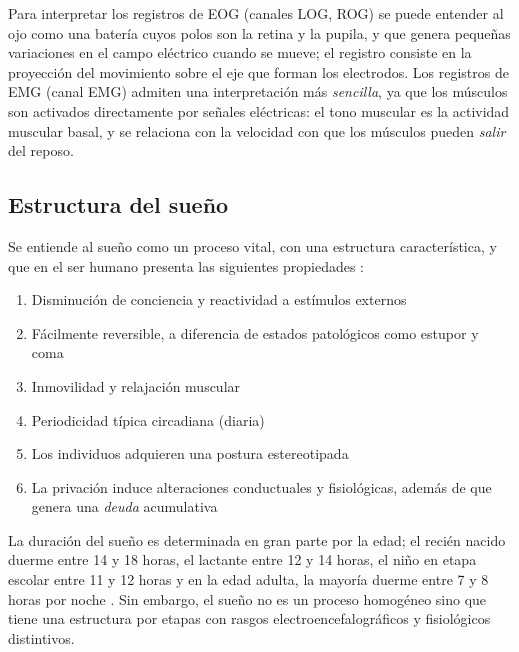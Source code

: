 Para interpretar los registros de EOG (canales LOG, ROG) se puede entender al ojo como una batería
cuyos  polos son la retina y la pupila, y que genera pequeñas variaciones en el campo eléctrico
cuando se mueve; el registro consiste en la proyección del movimiento sobre el eje que forman los
electrodos.
%
Los registros de EMG (canal EMG) admiten una interpretación más \textit{sencilla}, ya que los
músculos son activados directamente por señales eléctricas: el tono muscular es la actividad 
muscular basal, y se relaciona con la velocidad con que los músculos pueden \textit{salir} del 
reposo.



\subsection{Estructura del sueño}

Se entiende al sueño como un proceso vital, con una estructura característica, y que en el ser 
humano presenta las siguientes propiedades \cite{CarrilloMora}:
\begin{enumerate}
\item Disminución de conciencia y reactividad a estímulos externos
\item Fácilmente reversible, a diferencia de estados patológicos como estupor y coma
\item Inmovilidad y relajación muscular
\item Periodicidad típica circadiana (diaria)
\item Los individuos adquieren una postura estereotipada
\item La privación induce alteraciones conductuales y 
fisiológicas, además de que genera una \textit{deuda} acumulativa
\end{enumerate}

La duración del sueño es determinada en gran parte por la edad; el recién nacido duerme entre 14 y 
18 horas, el lactante entre 12 y 14 horas, el niño en etapa escolar entre 11 y 12 horas y en la 
edad adulta, la mayoría duerme entre 7 y 8 horas por noche \cite{Contreras13}.
Sin embargo, el sueño no es un proceso homogéneo sino que tiene una estructura 
por etapas con rasgos electroencefalográficos y fisiológicos distintivos.

